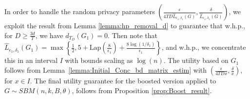 \documentclass{article}
\begin{document}
In order to handle the random privacy parameters $\left(\frac{\epsilon}{4TD\hat{L}_{\epsilon_1, \delta_1}(G)}, \frac{\delta}{\hat{L}_{\epsilon_1, \delta_1}(G)}\right)$, we exploit the result from Lemma \ref{lemma:hp_removal_d} to guarantee that w.h.p., for $D \geq \frac{3d}{T}$, we have $d_{T_{D}}(G_1) = 0$. Then note that $\hat{L}_{\epsilon_1, \delta_1}(G_1) = \max\left\{\frac{1}{2}, 5 + \mathrm{Lap}\left(\frac{8}{\epsilon_1}\right) + \frac{8\log(1/\delta_1)}{\epsilon_1}\right\}$, and w.h.p., we concentrate this in an interval $I$ with bounds scaling as $\log(n)$. The utility based on $G_1$ follows from Lemma~\ref{lemma:Initial_Conc_bd_matrix_estim} with $\left(\frac{\epsilon}{4TDx}, \frac{\delta}{x}\right)$, for $x \in I$. The final utility guarantee for the boosted version applied to $G \sim SBM(n, k, B, \theta)$, follows from Proposition \ref{prop:Boost_result}.
\end{document}
